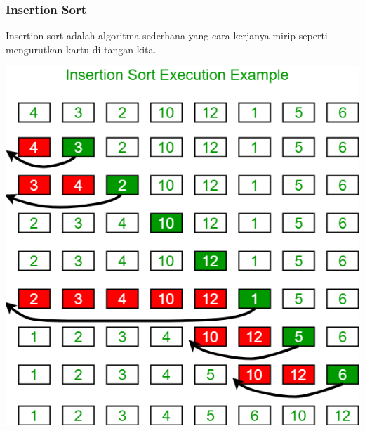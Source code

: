 \documentclass[a4paper,12pt]{article}
\begin{document}
\subsubsection{Insertion Sort}
Insertion sort adalah algoritma sederhana yang cara kerjanya mirip seperti mengurutkan kartu di tangan kita.
\begin{center}
    \includegraphics[scale=0.6]{insertionsort.png} 
\end{center}
\end{document}
